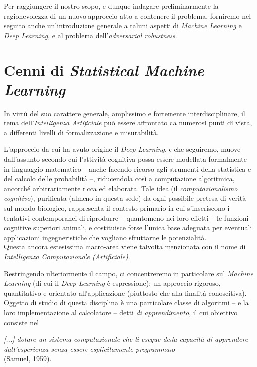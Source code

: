 \documentclass[a4paper, twoside]{article}
\begin{document}
Per raggiungere il nostro scopo, e dunque indagare preliminarmente la ragionevolezza di un nuovo approccio atto a contenere il problema, forniremo nel seguito anche un'introduzione generale a taluni aspetti di \textit{Machine Learning} e \textit{Deep Learning}, e al problema dell'\textit{adversarial robustness}.



\newpage
\section{Cenni di \textit{Statistical Machine Learning}}

In virtù del suo carattere generale, amplissimo e fortemente interdisciplinare, il tema dell'\textit{Intelligenza Artificiale} può essere affrontato da numerosi punti di vista, a differenti livelli di formalizzazione e misurabilità.

L'approccio da cui ha avuto origine il \textit{Deep Learning}, e che seguiremo, muove dall'assunto secondo cui l'attività cognitiva possa essere modellata formalmente in linguaggio matematico -- anche facendo ricorso agli strumenti della statistica e del calcolo delle probabilità --, riducendola così a computazione algoritmica, ancorché arbitrariamente ricca ed elaborata. Tale idea (il \textit{computazionalismo cognitivo}), purificata (almeno in questa sede) da ogni possibile pretesa di verità sul mondo biologico, rappresenta il contesto primario in cui s'inseriscono i tentativi contemporanei di riprodurre -- quantomeno nei loro effetti -- le funzioni cognitive superiori animali, e costituisce forse l'unica base adeguata per eventuali applicazioni ingegneristiche che vogliano sfruttarne le potenzialità.\\
Questa ancora estesissima macro-area viene talvolta menzionata con il nome di \textit{Intelligenza Computazionale (Artificiale)}.

Restringendo ulteriormente il campo, ci concentreremo in particolare sul \textit{Machine Learning} (di cui il \textit{Deep Learning} è espressione): un approccio rigoroso, quantitativo e orientato all'applicazione (piuttosto che alla finalità conoscitiva). Oggetto di studio di questa disciplina è una particolare classe di algoritmi -- e la loro implementazione al calcolatore -- detti \textit{di apprendimento}, il cui obiettivo consiste nel
\begin{displayquote}
\textit{[...] dotare un sistema computazionale che li esegue della capacità di apprendere dall'esperienza senza essere esplicitamente programmato} \\(Samuel, 1959).
\end{displayquote}
\end{document}
